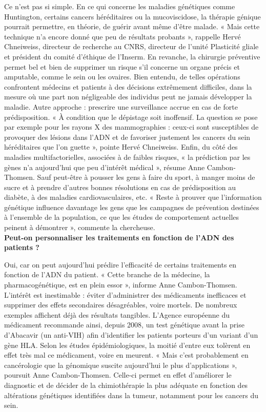 \documentclass[8pt]{article}
\begin{document}
Ce n’est pas si simple. En ce qui concerne les maladies génétiques comme Huntington, certains cancers héréditaires ou la mucoviscidose, la thérapie génique pourrait permettre, en théorie, de guérir avant même d’être malade. « Mais cette technique n’a encore donné que peu de résultats probants », rappelle Hervé Chneiweiss, directeur de recherche au CNRS, directeur de l’unité Plasticité gliale et président du comité d’éthique de l’Inserm. En revanche, la chirurgie préventive permet bel et bien de supprimer un risque s’il concerne un organe précis et amputable, comme le sein ou les ovaires. Bien entendu, de telles opérations confrontent médecins et patients à des décisions extrêmement difficiles, dans la mesure où une part non négligeable des individus peut ne jamais développer la maladie. Autre approche : prescrire une surveillance accrue en cas de forte prédisposition. « À condition que le dépistage soit inoffensif. La question se pose par exemple pour les rayons X des mammographies : ceux-ci sont susceptibles de provoquer des lésions dans l’ADN et de favoriser justement les cancers du sein héréditaires que l’on guette », pointe Hervé Chneiweiss. Enfin, du côté des maladies multifactorielles, associées à de faibles risques, « la prédiction par les gènes n’a aujourd’hui que peu d’intérêt médical », résume Anne Cambon-Thomsen. Sauf peut-être à pousser les gens à faire du sport, à manger moins de sucre et à prendre d’autres bonnes résolutions en cas de prédisposition au diabète, à des maladies cardiovasculaires, etc. « Reste à prouver que l’information génétique influence davantage les gens que les campagnes de prévention destinées à l’ensemble de la population, ce que les études de comportement actuelles peinent à démontrer », commente la chercheuse.  \\

\textbf{Peut-on personnaliser les traitements en fonction de l’ADN des patients ?}

Oui, car on peut aujourd’hui prédire l’efficacité de certains traitements en fonction de l’ADN du patient. « Cette branche de la médecine, la pharmacogénétique, est en plein essor », informe Anne Cambon-Thomsen. L’intérêt est inestimable : éviter d’administrer des médicaments inefficaces et supprimer des effets secondaires désagréables, voire mortels. De nombreux exemples affichent déjà des résultats tangibles. L’Agence européenne du médicament recommande ainsi, depuis 2008, un test génétique avant la prise d’Abacavir (un anti-VIH) afin d’identifier les patients porteurs d’un variant d’un gène HLA. Selon les études épidémiologiques, la moitié d’entre eux tolèrent en effet très mal ce médicament, voire en meurent. « Mais c’est probablement en cancérologie que la génomique suscite aujourd’hui le plus d’applications », poursuit Anne Cambon-Thomsen. Celle-ci permet en effet d’améliorer le diagnostic et de décider de la chimiothérapie la plus adéquate en fonction des altérations génétiques identifiées dans la tumeur, notamment pour les cancers du sein.  \\
\end{document}
